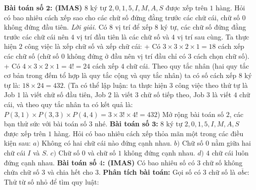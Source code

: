 \begin{multicols}{2}
\begin{figure}[H]
		\vspace*{-10pt}
	\end{figure}
	\textbf{\color{toancuabi}Bài toán số $\pmb{2}$: (IMAS)}
	\vskip 0.1cm
	$8$ ký tự $2,0,1,5,I,M,A,S$ được xếp trên $1$ hàng. Hỏi có bao nhiêu cách xếp sao cho các chữ số đứng đằng trước các chữ cái, chữ số $0$ không đứng đầu tiên.
	\vskip 0.1cm
	\textit{Lời giải.}
	Có $8$ vị trí để xếp $8$ ký tự, các chữ số đứng đằng trước các chữ cái nên $4$ vị trí đầu tiên là các chữ số và $4$ vị trí sau cùng. Ta thực hiện $2$ công việc là xếp chữ số và xếp chữ cái:
	\vskip 0.1cm
	+ Có $3\times3\times2\times1=18$ cách xếp các chữ số (chữ số $0$ không đứng ở đầu nên vị trí đầu chỉ có $3$ cách chọn chữ số).
	\vskip 0.1cm
	+ Có $4\times3\times2\times1=4!=24$ cách xếp $4$ chữ cái.
	\vskip 0.1cm
	Theo quy tắc nhân (hai quy tắc cơ bản trong đếm tổ hợp là quy tắc cộng và quy tắc nhân) ta có số cách xếp $8$ ký tự là: $18\times24=432$.
	\vskip 0.1cm
	(Ta có thể lập luận: ta thực hiện $3$ công việc theo thứ tự là Job $1$ là viết chữ số đầu tiên, Job $2$ là viết $3$ chữ số tiếp theo, Job $3$ là viết $4$ chữ cái, và theo quy tắc nhân ta có kết quả là: $P(3,1)\times P(3,3)\times P(4,4)=3\times3!\times4!=432$)
	\vskip 0.1cm
	Mở rộng bài toán số $2$, các bạn thử sức với bài toán số $3$ nhé.
	\vskip 0.1cm
	\textbf{\color{toancuabi}Bài toán số $\pmb{3}$:}
	\vskip 0.1cm
	$8$ ký tự $2,0,1,5,I,M,A,S$ được xếp trên $1$ hàng. Hỏi có bao nhiêu cách xếp thỏa mãn một trong các điều kiện sau:
	\vskip 0.1cm
	$a)$ Không có hai chữ cái nào đứng cạnh nhau.
	\vskip 0.1cm
	$b)$ Chữ số $0$ nằm giữa hai chữ cái $I$ và $S$.
	\vskip 0.1cm
	$c)$ Chữ số $0$ và chữ số $1$ không đứng cạnh nhau.
	\vskip 0.1cm
	$d)$ $4$ chữ cái luôn đứng cạnh nhau.
	\vskip 0.1cm
	\textbf{\color{toancuabi}Bài toán số $4$: (IMAS)}
	\vskip 0.1cm
	Có bao nhiêu số có $3$ chữ số không chứa chữ số $3$ và chia hết cho $3$.
	\vskip 0.1cm
	\textbf{\color{toancuabi}Phân tích bài toán:}
	\vskip 0.1cm
	Gọi số có $3$ chữ số là $\overline{abc}$:
	\vskip 0.1cm
	Thử từ số nhỏ để tìm quy luật:

\end{multicols}
